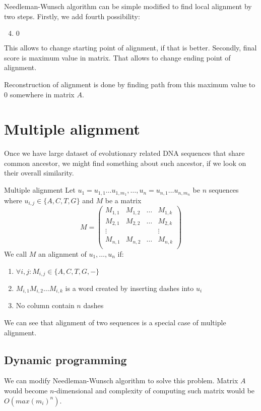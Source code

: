 Needleman-Wunsch algorithm can be simple modified to find local alignment by two steps.
Firstly, we add fourth possibility:
\begin{enumerate}
 \setcounter{enumi}{3}
\item $0$
\end{enumerate}
This allows to change starting point of alignment, if that is better.
Secondly, final score is maximum value in matrix. That allows to change ending point of alignment.

Reconstruction of alignment is done by finding path from this maximum value to $0$ somewhere in matrix $A$.

\section{Multiple alignment}
Once we have large dataset of evolutionary related DNA sequences that share common ancestor, we might find something about such ancestor, if we look on their overall similarity.

\begin{definition}{Multiple alignment}
Let $u_1=u_{1,1} \dots u_{1,m_1}, \ldots, u_n=u_{n,1} \dots u_{n,m_n}$ be $n$ sequences where $u_{i,j} \in \{A, C, T, G\}$ and $M$ be a matrix
$$M=
\begin{pmatrix}
  M_{1,1} & M_{1,2} & \dots & M_{1,k} \\
  M_{2,1} & M_{2,2} & \dots & M_{2,k} \\
  \vdots&&&\vdots\\
  M_{n,1} & M_{n,2} & \dots & M_{n,k} \\
\end{pmatrix}$$
We call $M$ an alignment of $u_1, \dots, u_n$ if:
\begin{enumerate}
\item $\forall i,j : M_{i,j}\in \{A,C,T,G,-\}$
\item $M_{i,1} M_{i,2} \dots M_{i,k}$ is a word created by inserting dashes into $u_i$
\item No column contain $n$ dashes
\end{enumerate}
\end{definition}

We can see that alignment of two sequences is a special case of multiple alignment.

\subsection{Dynamic programming}
We can modify Needleman-Wunsch algorithm to solve this problem.
Matrix $A$ would become $n$-dimensional and complexity of computing such matrix would be $O(max(m_i)^n)$.

